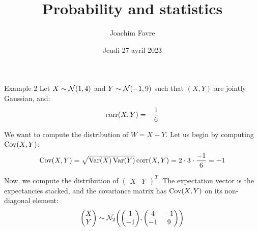 \documentclass[a4paper]{article}
\title{Probability and statistics}
\author{Joachim Favre}
\date{Jeudi 27 avril 2023}
\begin{document}
\maketitle


\begin{parag}{Example 2}
    Let $X \followsdistr \mathcal{N}\left(1, 4\right)$ and $Y \followsdistr \mathcal{N}\left(-1, 9\right)$ such that $\left(X, Y\right)$ are jointly Gaussian, and: 
    \[\corr\left(X, Y\right) = -\frac{1}{6}\]

    We want to compute the distribution of $W = X + Y$. Let us begin by computing $\Cov\left(X, Y\right)$: 
    \[\Cov\left(X, Y\right) = \sqrt{\Var\left(X\right)\Var\left(Y\right)}\corr\left(X, Y\right) = 2\cdot 3\cdot \frac{-1}{6} = -1\]

    Now, we compute the distribution of $\begin{pmatrix} X & Y \end{pmatrix}^T$. The expectation vector is the expectancies stacked, and the covariance matrix has $\Cov\left(X, Y\right)$ on its non-diagonal element: 
    \[\begin{pmatrix} X \\ Y \end{pmatrix} \followsdistr \mathcal{N}_2\left(\begin{pmatrix} 1 \\ -1 \end{pmatrix}, \begin{pmatrix} 4 & -1 \\ -1 & 9 \end{pmatrix}\right)\]


\end{parag}
\end{document}
